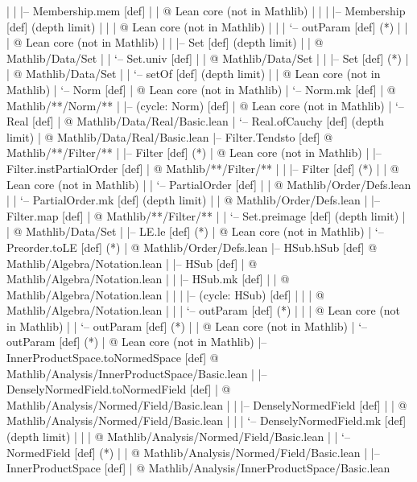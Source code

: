 \documentclass[11pt,reqno]{amsart}
\begin{document}
\begin{verbatimbox}
|   |       |-- Membership.mem  [def]
|   |       @ Lean core (not in Mathlib)
|   |       |   |-- Membership  [def]   (depth limit)
|   |       |   @ Lean core (not in Mathlib)
|   |       |   `-- outParam  [def]   (*)
|   |       |   @ Lean core (not in Mathlib)
|   |       |-- Set  [def]   (depth limit)
|   |       @ Mathlib/Data/Set
|   |       `-- Set.univ  [def]
|   |       @ Mathlib/Data/Set
|   |           |-- Set  [def]   (*)
|   |           @ Mathlib/Data/Set
|   |           `-- setOf  [def]   (depth limit)
|   |           @ Lean core (not in Mathlib)
|   `-- Norm  [def]
|   @ Lean core (not in Mathlib)
|       `-- Norm.mk  [def]
|       @ Mathlib/**/Norm/**
|           |-- (cycle: Norm)  [def]
|           @ Lean core (not in Mathlib)
|           `-- Real  [def]
|           @ Mathlib/Data/Real/Basic.lean
|               `-- Real.ofCauchy  [def]   (depth limit)
|               @ Mathlib/Data/Real/Basic.lean
|-- Filter.Tendsto  [def]
@ Mathlib/**/Filter/**
|   |-- Filter  [def]   (*)
|   @ Lean core (not in Mathlib)
|   |-- Filter.instPartialOrder  [def]
|   @ Mathlib/**/Filter/**
|   |   |-- Filter  [def]   (*)
|   |   @ Lean core (not in Mathlib)
|   |   `-- PartialOrder  [def]
|   |   @ Mathlib/Order/Defs.lean
|   |       `-- PartialOrder.mk  [def]   (depth limit)
|   |       @ Mathlib/Order/Defs.lean
|   |-- Filter.map  [def]
|   @ Mathlib/**/Filter/**
|   |   `-- Set.preimage  [def]   (depth limit)
|   |   @ Mathlib/Data/Set
|   |-- LE.le  [def]   (*)
|   @ Lean core (not in Mathlib)
|   `-- Preorder.toLE  [def]   (*)
|   @ Mathlib/Order/Defs.lean
|-- HSub.hSub  [def]
@ Mathlib/Algebra/Notation.lean
|   |-- HSub  [def]
|   @ Mathlib/Algebra/Notation.lean
|   |   |-- HSub.mk  [def]
|   |   @ Mathlib/Algebra/Notation.lean
|   |   |   |-- (cycle: HSub)  [def]
|   |   |   @ Mathlib/Algebra/Notation.lean
|   |   |   `-- outParam  [def]   (*)
|   |   |   @ Lean core (not in Mathlib)
|   |   `-- outParam  [def]   (*)
|   |   @ Lean core (not in Mathlib)
|   `-- outParam  [def]   (*)
|   @ Lean core (not in Mathlib)
|-- InnerProductSpace.toNormedSpace  [def]
@ Mathlib/Analysis/InnerProductSpace/Basic.lean
|   |-- DenselyNormedField.toNormedField  [def]
|   @ Mathlib/Analysis/Normed/Field/Basic.lean
|   |   |-- DenselyNormedField  [def]
|   |   @ Mathlib/Analysis/Normed/Field/Basic.lean
|   |   |   `-- DenselyNormedField.mk  [def]   (depth limit)
|   |   |   @ Mathlib/Analysis/Normed/Field/Basic.lean
|   |   `-- NormedField  [def]   (*)
|   |   @ Mathlib/Analysis/Normed/Field/Basic.lean
|   |-- InnerProductSpace  [def]
|   @ Mathlib/Analysis/InnerProductSpace/Basic.lean

\end{verbatimbox}
\end{document}
